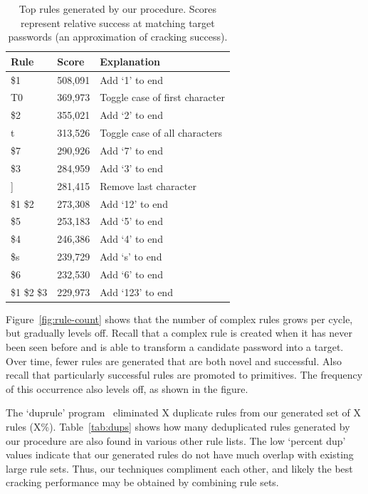 \documentclass[letterpaper,twocolumn,10pt]{article}
\begin{document}
\begin{table}
\centering
\begin{tabular}{|l|l|l|}
\hline
Rule & Score & Explanation \\
\hline
\$1 & 508,091 & Add `1' to end \\
T0 & 369,973 & Toggle case of first character \\
\$2 & 355,021 & Add `2' to end \\
t & 313,526 & Toggle case of all characters \\
\$7 & 290,926 & Add `7' to end \\
\$3 & 284,959 & Add `3' to end \\
] & 281,415 & Remove last character \\
\$1 \$2 & 273,308 & Add `12' to end \\
\$5 & 253,183 & Add `5' to end \\
\$4 & 246,386 & Add `4' to end \\
\$s & 239,729 & Add `s' to end \\
\$6 & 232,530 & Add `6' to end \\
\$1 \$2 \$3 & 229,973 & Add `123' to end \\
\hline
\end{tabular}
\caption{Top rules generated by our procedure. Scores represent relative
success at matching target passwords (an approximation of cracking success).}
\label{tab:top_rules}
\end{table}

Figure~\ref{fig:rule-count} shows that the number of complex rules grows per cycle, but gradually levels off. Recall that a complex rule is created when it has never been seen before and is able to transform a candidate password into a target. Over time, fewer rules are generated that are both novel and successful. Also recall that particularly successful rules are promoted to primitives. The frequency of this occurrence also levels off, as shown in the figure.

The `duprule' program~\cite{duprule} eliminated X duplicate rules from our generated set of X rules (X\%). Table~\ref{tab:dups} shows how many deduplicated rules generated by our procedure are also found in various other rule lists. The low `percent dup' values indicate that our generated rules do not have much overlap with existing large rule sets. Thus, our techniques compliment each other, and likely the best cracking performance may be obtained by combining rule sets.
\end{document}
